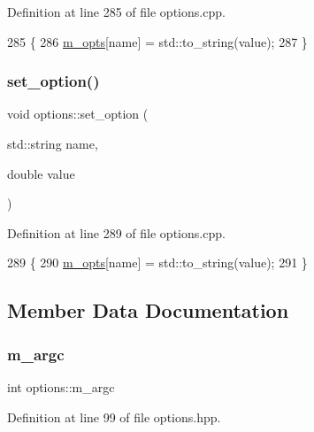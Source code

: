 Definition at line 285 of file options.\+cpp.


\begin{DoxyCode}
285                                                     \{
286   \hyperlink{classoptions_ac73507ca925d98ee5ff6f04937dff5c3}{m\_opts}[name] = std::to\_string(value);
287 \}
\end{DoxyCode}
\mbox{\label{classoptions_a42eb183c3fd8156c226559663893bb92}} 
\subsubsection{\texorpdfstring{set\+\_\+option()}{set\_option()}\hspace{0.1cm}{\footnotesize\ttfamily [5/5]}}
{\footnotesize\ttfamily void options\+::set\+\_\+option (\begin{DoxyParamCaption}\item[{std\+::string}]{name,  }\item[{double}]{value }\end{DoxyParamCaption})}



Definition at line 289 of file options.\+cpp.


\begin{DoxyCode}
289                                                      \{
290   \hyperlink{classoptions_ac73507ca925d98ee5ff6f04937dff5c3}{m\_opts}[name] = std::to\_string(value);
291 \}
\end{DoxyCode}


\subsection{Member Data Documentation}
\mbox{\label{classoptions_a5df2188c2d1bb81cbebef4b2e80a926f}} 
\subsubsection{\texorpdfstring{m\+\_\+argc}{m\_argc}}
{\footnotesize\ttfamily int options\+::m\+\_\+argc\hspace{0.3cm}{\ttfamily [private]}}



Definition at line 99 of file options.\+hpp.

